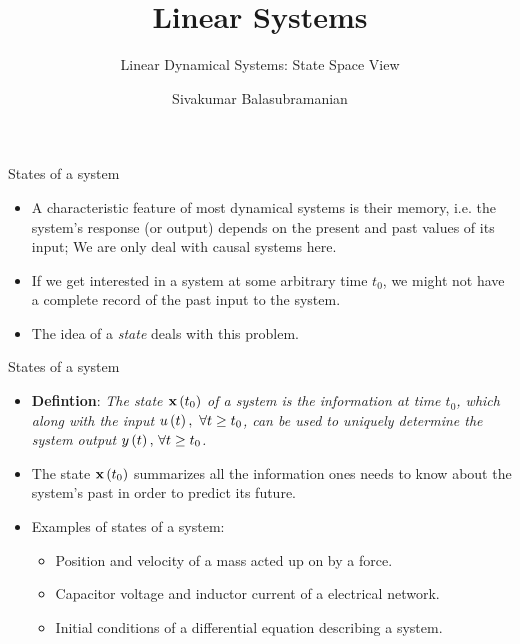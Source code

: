 \documentclass[aspectratio=169]{beamer}
\title{Linear Systems}
\subtitle{Linear Dynamical Systems: State Space View}
\author{Sivakumar Balasubramanian}
\institute[Christian Medical College] %
{
  \inst{}%
  Department of Bioengineering\\
  Christian Medical College, Bagayam\\
  Vellore 632002
}
\date{}
\def\mf{\ensuremath\mathbf}
\def\lp{\ensuremath\left(}
\def\rp{\ensuremath\right)}
\begin{document}

\begin{frame}
  \titlepage
\end{frame}


\begin{frame}[t]{States of a system}
\begin{itemize}
    \item A characteristic feature of most dynamical systems is their memory, i.e. the system's response (or output) depends on the present and past values of its input; We are only deal with causal systems here.

    \item If we get interested in a system at some arbitrary time $t_0$, we might not have a complete record of the past input to the system.

    \item The idea of a \textit{state} deals with this problem. 
\end{itemize}
\end{frame}



\begin{frame}[t]{States of a system}
\begin{itemize}
    \item \textbf{Defintion}: \textit{The state $\mf{x}\lp t_0\rp$ of a system is the information at time $t_0$, which along with the input $u\lp t\rp,\ \forall t \geq t_0$, can be used to uniquely determine the system output $y\lp t\rp, \, \forall t \geq t_0$.}

    \item The state $\mf{x}\lp t_0\rp$ summarizes all the information ones needs to know about the system's past in order to predict its future.

    \item Examples of states of a system:
    \begin{itemize}
        \item Position and velocity of a mass acted up on by a force.
        \item Capacitor voltage and inductor current of a electrical network.
        \item Initial conditions of a differential equation describing a system.
    \end{itemize}
\end{itemize}
\end{frame}
\end{document}
